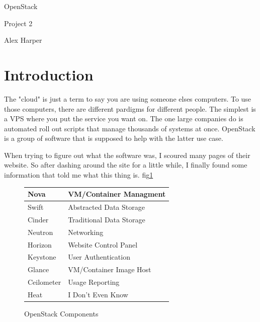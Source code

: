 \documentclass[12pt]{article}
\begin{document}
\begin{titlepage}
	\centering
	{\Huge OpenStack\par}
	\vspace{0.25in}
	{\Large Project 2\par}
	\vspace{2in}
	{Alex Harper\par}
	\newpage
\end{titlepage}

\tableofcontents
\newpage

\listoffigures
\newpage
\setlength{\parindent}{4em} %
\setlength{\parskip}{1em} %


\section{Introduction}

The "cloud" is just a term to say you are using someone elses computers.
To use those computers, there are different pardigms for different people.
The simplest is a VPS where you put the service you want on.
The one large companies do is automated roll out scripts that manage thousands of systems at once.
OpenStack is a group of software that is supposed to help with the latter use case.

When trying to figure out what the software was, I scoured many pages of their website.
So after dashing around the site for a little while, I finally found some information that told me what this thing is. fig\ref{components}

\begin{figure}[ht]
	\centering
	\begin{tabular}{|l|l|}
	\hline
	Nova&VM/Container Managment \\ \hline
	Swift&Abstracted Data Storage \\ \hline
	Cinder&Traditional Data Storage \\ \hline
	Neutron&Networking \\ \hline
	Horizon&Website Control Panel \\ \hline
	Keystone&User Authentication \\ \hline
	Glance&VM/Container Image Host \\ \hline
	Ceilometer&Usage Reporting \\ \hline
	Heat&I Don't Even Know \\ \hline
	\end{tabular}
	\caption{OpenStack Components}
	\label{components}
\end{figure}
\end{document}
